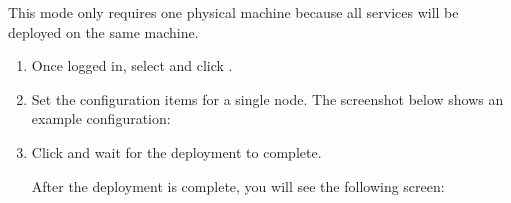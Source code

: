 \documentclass[letterpaper,10pt,english]{sphinxmanual}
\begin{document}
\sphinxAtStartPar
This mode only requires one physical machine because all services will be deployed on the same machine.
\begin{enumerate}
%
\item {} 
\sphinxAtStartPar
Once logged in, select  and click .

\item {} 
\sphinxAtStartPar
Set the configuration items for a single node. The screenshot below shows an example configuration:

\noindent{}

\item {} 
\sphinxAtStartPar
Click  and wait for the deployment to complete.

\sphinxAtStartPar
After the deployment is complete, you will see the following screen:

\noindent{}

\end{enumerate}
\end{document}
